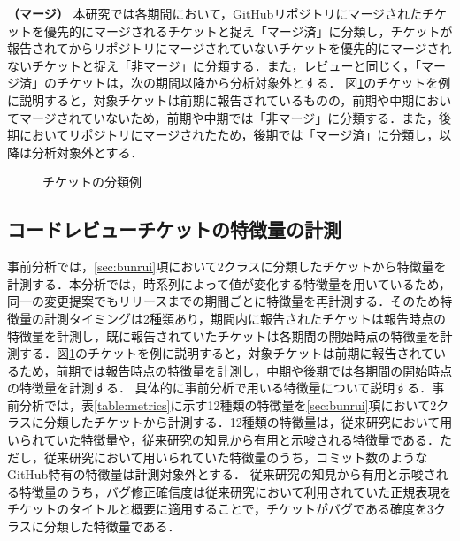 \documentclass[submit]{ipsj}
\begin{document}
\textbf{（マージ）} 本研究では各期間において，GitHubリポジトリにマージされたチケットを優先的にマージされるチケットと捉え「マージ済」に分類し，チケットが報告されてからリポジトリにマージされていないチケットを優先的にマージされないチケットと捉え「非マージ」に分類する．また，レビューと同じく，「マージ済」のチケットは，次の期間以降から分析対象外とする．
図\ref{fig:labeling}のチケットを例に説明すると，対象チケットは前期に報告されているものの，前期や中期においてマージされていないため，前期や中期では「非マージ」に分類する．また，後期においてリポジトリにマージされたため，後期では「マージ済」に分類し，以降は分析対象外とする．

\begin{figure}[h]
\begin{center}
\caption{チケットの分類例}
\label{fig:labeling}
\end{center}
\end{figure}


\subsection{コードレビューチケットの特徴量の計測}\label{sec:metrics}
事前分析では，\ref{sec:bunrui}項において2クラスに分類したチケットから特徴量を計測する．本分析では，時系列によって値が変化する特徴量を用いているため，同一の変更提案でもリリースまでの期間ごとに特徴量を再計測する．そのため特徴量の計測タイミングは2種類あり，期間内に報告されたチケットは報告時点の特徴量を計測し，既に報告されていたチケットは各期間の開始時点の特徴量を計測する．図\ref{fig:labeling}のチケットを例に説明すると，対象チケットは前期に報告されているため，前期では報告時点の特徴量を計測し，中期や後期では各期間の開始時点の特徴量を計測する．
具体的に事前分析で用いる特徴量について説明する．事前分析では，表\ref{table:metrics}に示す12種類の特徴量を\ref{sec:bunrui}項において2クラスに分類したチケットから計測する．12種類の特徴量は，従来研究\cite{prioritizer}において用いられていた特徴量や，従来研究\cite{release_merge}\cite{review1}の知見から有用と示唆される特徴量である．ただし，従来研究\cite{prioritizer}において用いられていた特徴量のうち，コミット数のようなGitHub特有の特徴量は計測対象外とする．
従来研究\cite{release_merge}\cite{review1}の知見から有用と示唆される特徴量のうち，バグ修正確信度は従来研究\cite{bug}において利用されていた正規表現をチケットのタイトルと概要に適用することで，チケットがバグである確度を3クラスに分類した特徴量である．
\end{document}
